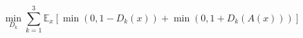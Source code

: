 $$
\min_{D_k}\sum_{k=1}^3\mathbb{E}_x\left[
  \min\left( 0, 1 - D_k\left( x\right)\right) +
  \min\left( 0, 1 + D_k\left( A\left( x\right)\right)\right)
\right]
$$
